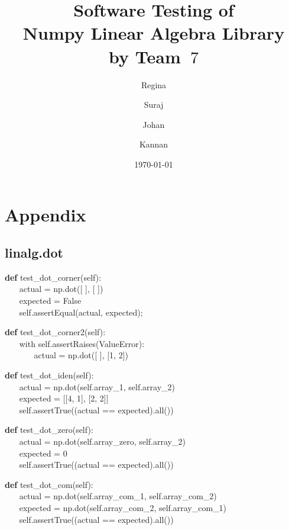 \documentclass[a4paper,11pt]{article}
\title{\textbf{Software Testing of \\ Numpy Linear Algebra Library\\
        by Team~$7$                                   %
}
}
\author{Regina \and Suraj \and Johan \and Kannan}  %
\date{\today}
\begin{document}
	
	
\section{Appendix}
\subsection{linalg.dot}

\begin{algorithm}[H]
	\textbf{def} test\_dot\_corner(self):
	\\ $ ~~~~~~~~ $actual = np.dot([ ], [ ])
	\\ $ ~~~~~~~~ $expected = False
	\\ $ ~~~~~~~~ $self.assertEqual(actual, expected);
\end{algorithm}

\begin{algorithm}[H]
	\textbf{def} test\_dot\_corner2(self):
	\\ $ ~~~~~~~~ $with self.assertRaises(ValueError):
	\\ $ ~~~~~~~~~~~~~~~~ $actual = np.dot([ ], [1, 2])
\end{algorithm}



\begin{algorithm}[H]
	\textbf{def} test\_dot\_iden(self):
	\\ $ ~~~~~~~~ $actual = np.dot(self.array\_1, self.array\_2)
	\\ $ ~~~~~~~~ $expected = [[4, 1], [2, 2]]
	\\ $ ~~~~~~~~ $self.assertTrue((actual == expected).all())
\end{algorithm}

\begin{algorithm}[H]
	\textbf{def} test\_dot\_zero(self):
	\\ $ ~~~~~~~~ $actual = np.dot(self.array\_zero, self.array\_2)
	\\ $ ~~~~~~~~ $expected = 0
	\\ $ ~~~~~~~~ $self.assertTrue((actual == expected).all())
\end{algorithm}

\begin{algorithm}[H]
    \textbf{def} test\_dot\_com(self):
\\ $ ~~~~~~~~ $actual = np.dot(self.array\_com\_1, self.array\_com\_2)
\\ $ ~~~~~~~~ $expected = np.dot(self.array\_com\_2, self.array\_com\_1)
\\ $ ~~~~~~~~ $self.assertTrue((actual == expected).all())
\end{algorithm}
\end{document}
